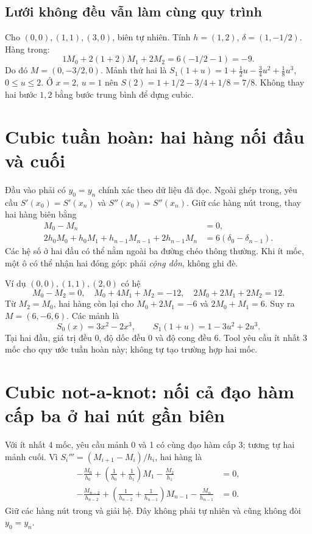 \subsection{Lưới không đều vẫn làm cùng quy trình}
\label{sec:spline-nonuniform}
Cho $(0,0),(1,1),(3,0)$, biên tự nhiên.
Tính $h=(1,2)$, $\delta=(1,-1/2)$. Hàng trong:
\[
1M_0+2(1+2)M_1+2M_2=6(-1/2-1)=-9.
\]
Do đó $M=(0,-3/2,0)$.
Mảnh thứ hai là $S_1(1+u)=1+\frac12u-\frac34u^2+\frac18u^3$, $0\leq u\leq2$.
Ở $x=2$, $u=1$ nên $S(2)=1+1/2-3/4+1/8=7/8$.
Không thay hai bước $1,2$ bằng bước trung bình để dựng cubic.

\section{Cubic tuần hoàn: hai hàng nối đầu và cuối}
\label{sec:spline-periodic}
Đầu vào phải có $y_0=y_n$ chính xác theo dữ liệu đã đọc. Ngoài ghép trong, yêu cầu
$S'(x_0)=S'(x_n)$ và $S''(x_0)=S''(x_n)$.
Giữ các hàng nút trong, thay hai hàng biên bằng
\begin{align*}
M_0-M_n&=0,\\
2h_0M_0+h_0M_1+h_{n-1}M_{n-1}+2h_{n-1}M_n
&=6(\delta_0-\delta_{n-1}).
\end{align*}
Các hệ số ở hai đầu có thể nằm ngoài ba đường chéo thông thường.
Khi ít mốc, một ô có thể nhận hai đóng góp: phải \emph{cộng dồn}, không ghi đè.

Ví dụ $(0,0),(1,1),(2,0)$ có hệ
\[
M_0-M_2=0,\quad M_0+4M_1+M_2=-12,\quad
2M_0+2M_1+2M_2=12.
\]
Từ $M_2=M_0$, hai hàng còn lại cho $M_0+2M_1=-6$ và $2M_0+M_1=6$.
Suy ra $M=(6,-6,6)$.
Các mảnh là
\[
S_0(x)=3x^2-2x^3,\qquad S_1(1+u)=1-3u^2+2u^3.
\]
Tại hai đầu, giá trị đều 0, độ dốc đều 0 và độ cong đều 6.
Tool yêu cầu ít nhất 3 mốc cho quy ước tuần hoàn này; không tự tạo trường hợp hai mốc.

\section{Cubic not-a-knot: nối cả đạo hàm cấp ba ở hai nút gần biên}
\label{sec:spline-notaknot}
Với ít nhất 4 mốc, yêu cầu mảnh 0 và 1 có cùng đạo hàm cấp 3; tương tự hai mảnh cuối.
Vì $S_i'''=(M_{i+1}-M_i)/h_i$, hai hàng là
\begin{align*}
-\frac{M_0}{h_0}+\left(\frac1{h_0}+\frac1{h_1}\right)M_1-\frac{M_2}{h_1}&=0,\\
-\frac{M_{n-2}}{h_{n-2}}+\left(\frac1{h_{n-2}}+\frac1{h_{n-1}}\right)M_{n-1}-\frac{M_n}{h_{n-1}}&=0.
\end{align*}
Giữ các hàng nút trong và giải hệ. Đây không phải tự nhiên và cũng không đòi $y_0=y_n$.


